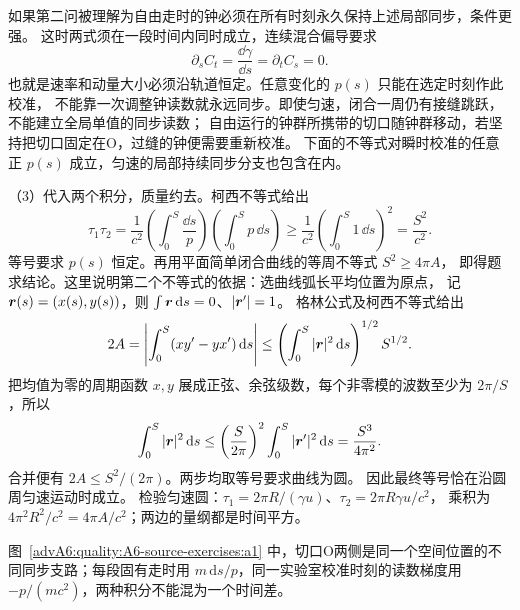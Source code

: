 \begin{advsolution}
如果第二问被理解为自由走时的钟必须在所有时刻永久保持上述局部同步，条件更强。
这时两式须在一段时间内同时成立，连续混合偏导要求
\[
 \partial_s C_t=\frac{\dd\gamma}{\dd s}
 =\partial_t C_s=0.
\]
也就是速率和动量大小必须沿轨道恒定。任意变化的 $p(s)$ 只能在选定时刻作此校准，
不能靠一次调整钟读数就永远同步。即使匀速，闭合一周仍有接缝跳跃，不能建立全局单值的同步读数；
自由运行的钟群所携带的切口随钟群移动，若坚持把切口固定在O，过缝的钟便需要重新校准。
下面的不等式对瞬时校准的任意正 $p(s)$ 成立，匀速的局部持续同步分支也包含在内。

（3）代入两个积分，质量约去。柯西不等式给出
\[
 \tau_1\tau_2
 =\frac1{c^2}\left(\int_0^S\frac{\dd s}{p}\right)
 \left(\int_0^S p\,\dd s\right)
 \ge\frac1{c^2}\left(\int_0^S1\,\dd s\right)^2
 =\frac{S^2}{c^2}.
\]
等号要求 $p(s)$ 恒定。再用平面简单闭合曲线的等周不等式 $S^2\ge4\pi A$，
即得题求结论。这里说明第二个不等式的依据：选曲线弧长平均位置为原点，
记 $\bm{r}(s)=(x(s),y(s))$，则 $\int\bm{r}\mathop{}\!\mathrm d s=0$、$|\bm{r}'|=1$。
格林公式及柯西不等式给出
\[
 2A=\left|\int_0^S(xy'-yx')\mathop{}\!\mathrm d s\right|
 \le\left(\int_0^S|\bm{r}|^2\mathop{}\!\mathrm d s\right)^{1/2}S^{1/2}.
\]
把均值为零的周期函数 $x,y$ 展成正弦、余弦级数，每个非零模的波数至少为 $2\pi/S$，所以
\[
 \int_0^S|\bm{r}|^2\mathop{}\!\mathrm d s
 \le\left(\frac S{2\pi}\right)^2\int_0^S|\bm{r}'|^2\mathop{}\!\mathrm d s
 =\frac{S^3}{4\pi^2}.
\]
合并便有 $2A\le S^2/(2\pi)$。两步均取等号要求曲线为圆。
因此最终等号恰在沿圆周匀速运动时成立。
检验匀速圆：$\tau_1=2\pi R/(\gamma u)$、$\tau_2=2\pi R\gamma u/c^2$，
乘积为 $4\pi^2R^2/c^2=4\pi A/c^2$；两边的量纲都是时间平方。

图~\ref{advA6:quality:A6-source-exercises:a1} 中，切口O两侧是同一个空间位置的不同同步支路；每段固有走时用 $m\,\mathrm ds/p$，同一实验室校准时刻的读数梯度用 $-p/(mc^2)$，两种积分不能混为一个时间差。
\end{advsolution}

